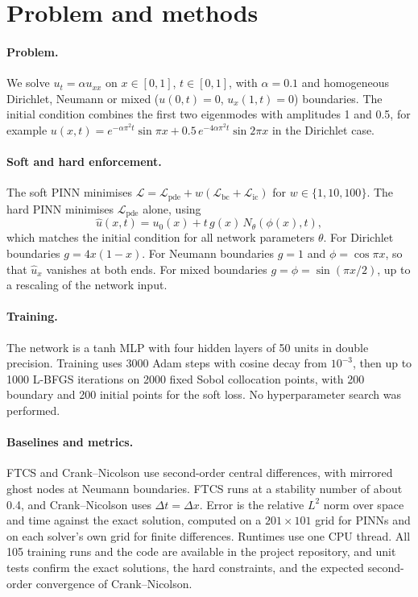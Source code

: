 \documentclass[10pt,a4paper]{article}
\begin{document}
\section{Problem and methods}
\paragraph{Problem.} We solve $u_t=\alpha u_{xx}$ on $x\in[0,1]$, $t\in[0,1]$, with $\alpha=0.1$ and homogeneous Dirichlet, Neumann or mixed ($u(0,t)=0$, $u_x(1,t)=0$) boundaries. The initial condition combines the first two eigenmodes with amplitudes 1 and 0.5, for example $u(x,t)=e^{-\alpha\pi^2 t}\sin\pi x+0.5\,e^{-4\alpha\pi^2 t}\sin 2\pi x$ in the Dirichlet case.

\paragraph{Soft and hard enforcement.} The soft PINN minimises $\mathcal{L}=\mathcal{L}_{\mathrm{pde}}+w(\mathcal{L}_{\mathrm{bc}}+\mathcal{L}_{\mathrm{ic}})$ for $w\in\{1,10,100\}$. The hard PINN minimises $\mathcal{L}_{\mathrm{pde}}$ alone, using
\begin{equation}
\hat{u}(x,t)=u_0(x)+t\,g(x)\,N_\theta(\phi(x),t),
\end{equation}
which matches the initial condition for all network parameters $\theta$. For Dirichlet boundaries $g=4x(1-x)$. For Neumann boundaries $g=1$ and $\phi=\cos\pi x$, so that $\hat{u}_x$ vanishes at both ends. For mixed boundaries $g=\phi=\sin(\pi x/2)$, up to a rescaling of the network input.

\paragraph{Training.} The network is a tanh MLP with four hidden layers of 50 units in double precision. Training uses 3000 Adam steps with cosine decay from $10^{-3}$, then up to 1000 L-BFGS iterations on 2000 fixed Sobol collocation points, with 200 boundary and 200 initial points for the soft loss. No hyperparameter search was performed.

\paragraph{Baselines and metrics.} FTCS and Crank--Nicolson use second-order central differences, with mirrored ghost nodes at Neumann boundaries. FTCS runs at a stability number of about 0.4, and Crank--Nicolson uses $\Delta t=\Delta x$. Error is the relative $L^2$ norm over space and time against the exact solution, computed on a $201\times101$ grid for PINNs and on each solver's own grid for finite differences. Runtimes use one CPU thread. All 105 training runs and the code are available in the project repository, and unit tests confirm the exact solutions, the hard constraints, and the expected second-order convergence of Crank--Nicolson.
\end{document}
